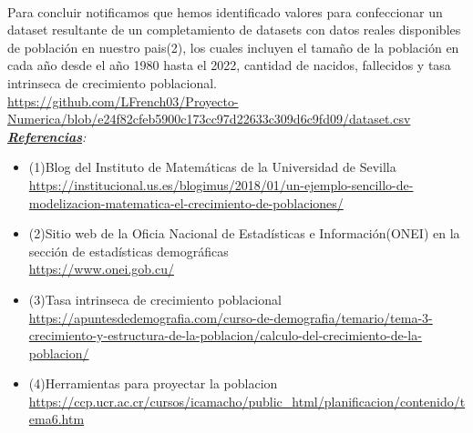 \documentclass{article}
\begin{document}
\\
Para concluir notificamos que hemos identificado valores para confeccionar un dataset resultante de un completamiento de datasets con datos reales disponibles de población en nuestro pais(2), los cuales
incluyen el tamaño de la población en cada año desde el año 1980 hasta el 2022, cantidad de nacidos, fallecidos y tasa intrinseca de crecimiento poblacional. 
\\
\url{https://github.com/LFrench03/Proyecto-Numerica/blob/e24f82cfeb5900c173cc97d22633c309d6c9fd09/dataset.csv}
\\\textit{\textbf{\underline{Referencias}}:}
\begin{itemize}
    \item (1)Blog del Instituto de Matemáticas de la Universidad de Sevilla \\\url{https://institucional.us.es/blogimus/2018/01/un-ejemplo-sencillo-de-modelizacion-matematica-el-crecimiento-de-poblaciones/}
    \item (2)Sitio web de la Oficia Nacional de Estadísticas e Información(ONEI) en la sección de estadísticas demográficas \\ \url{https://www.onei.gob.cu/}
    \item (3)Tasa intrinseca de crecimiento poblacional \\\url{https://apuntesdedemografia.com/curso-de-demografia/temario/tema-3-crecimiento-y-estructura-de-la-poblacion/calculo-del-crecimiento-de-la-poblacion/}
    \item (4)Herramientas para proyectar la poblacion \\\url{https://ccp.ucr.ac.cr/cursos/icamacho/public_html/planificacion/contenido/tema6.htm}
\end{itemize}
\end{document}
